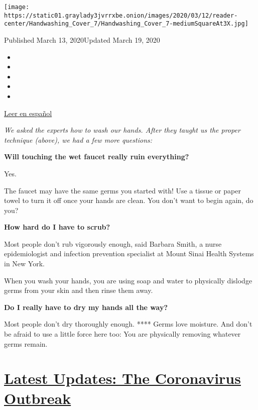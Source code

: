 \texttt{[image: https://static01.graylady3jvrrxbe.onion/images/2020/03/12/reader-center/Handwashing\_Cover\_7/Handwashing\_Cover\_7-mediumSquareAt3X.jpg]}

Published March 13, 2020Updated March 19, 2020

\begin{itemize}
\item
\item
\item
\item
\item
\end{itemize}

\href{https://www.nytimes3xbfgragh.onion/es/2020/03/19/espanol/ciencia-y-tecnologia/como-lavarse-las-manos-coronavirus.html}{Leer
en español}

\emph{We asked the experts how to wash our hands. After they taught us
the proper technique (above), we had a few more questions:}

\textbf{Will touching the wet faucet really ruin everything?}

Yes.

The faucet may have the same germs you started with! Use a tissue or
paper towel to turn it off once your hands are clean. You don't want to
begin again, do you?

\textbf{How hard do I have to scrub?}

Most people don't rub vigorously enough, said Barbara Smith, a nurse
epidemiologist and infection prevention specialist at Mount Sinai Health
Systems in New York.

When you wash your hands, you are using soap and water to physically
dislodge germs from your skin and then rinse them away.

\textbf{Do I really have to dry my hands all the way?}

Most people don't dry thoroughly enough. **** Germs love moisture. And
don't be afraid to use a little force here too: You are physically
removing whatever germs remain.

\hypertarget{latest-updates-the-coronavirus-outbreak}{%
\section{\texorpdfstring{\href{https://www.nytimes3xbfgragh.onion/2020/09/11/world/covid-19-coronavirus.html?action=click\&pgtype=Article\&state=default\&region=MAIN_CONTENT_1\&context=storylines_live_updates}{Latest
Updates: The Coronavirus
Outbreak}}{Latest Updates: The Coronavirus Outbreak}}\label{latest-updates-the-coronavirus-outbreak}}

